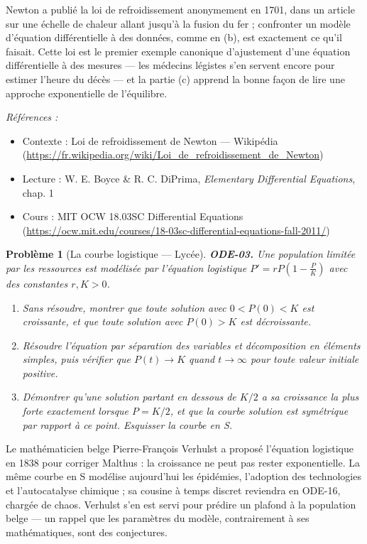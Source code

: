 \documentclass[11pt]{article}
\newtheorem{problem}{Problème}
\newenvironment{refs}{\par\small\noindent\emph{Références :}\begin{itemize}\setlength\itemsep{0pt}}{\end{itemize}\normalsize}
\begin{document}
\noindent Newton a publié la loi de refroidissement anonymement en 1701, dans un article
sur une échelle de chaleur allant jusqu'à la fusion du fer ; confronter un modèle d'équation
différentielle à des données, comme en (b), est exactement ce qu'il faisait. Cette loi est le
premier exemple canonique d'ajustement d'une équation différentielle à des mesures --- les
médecins légistes s'en servent encore pour estimer l'heure du décès --- et la partie (c) apprend
la bonne façon de lire une approche exponentielle de l'équilibre.

\begin{refs}
\item Contexte : Loi de refroidissement de Newton --- Wikipédia (\url{https://fr.wikipedia.org/wiki/Loi_de_refroidissement_de_Newton})
\item Lecture : W. E. Boyce \& R. C. DiPrima, \textit{Elementary Differential Equations}, chap. 1
\item Cours : MIT OCW 18.03SC Differential Equations (\url{https://ocw.mit.edu/courses/18-03sc-differential-equations-fall-2011/})
\end{refs}

\bigskip

\begin{problem}[{La courbe logistique --- Lycée}]
\textbf{ODE-03.} Une population limitée par les ressources est modélisée par l'équation
logistique $ P' = r P \left( 1 - \frac{P}{K} \right) $ avec des constantes
$ r, K >0 $.
\begin{enumerate}
\item[(a)] Sans résoudre, montrer que toute solution avec $ 0 <P(0) <K $ est croissante, et que
toute solution avec $ P(0) >K $ est décroissante.
\item[(b)] Résoudre l'équation par séparation des variables et décomposition en éléments simples, puis
vérifier que $ P(t) \to K $ quand $ t \to \infty $ pour toute valeur initiale
positive.
\item[(c)] Démontrer qu'une solution partant en dessous de $ K/2 $ a sa croissance la plus forte
exactement lorsque $ P = K/2 $, et que la courbe solution est symétrique par rapport à ce
point. Esquisser la courbe en S.
\end{enumerate}

\end{problem}

\noindent Le mathématicien belge Pierre-François Verhulst a proposé l'équation logistique
en 1838 pour corriger Malthus : la croissance ne peut pas rester exponentielle. La même courbe en
S modélise aujourd'hui les épidémies, l'adoption des technologies et l'autocatalyse chimique ;
sa cousine à temps discret reviendra en ODE-16, chargée de chaos. Verhulst s'en est servi pour
prédire un plafond à la population belge --- un rappel que les paramètres du modèle, contrairement
à ses mathématiques, sont des conjectures.
\end{document}
